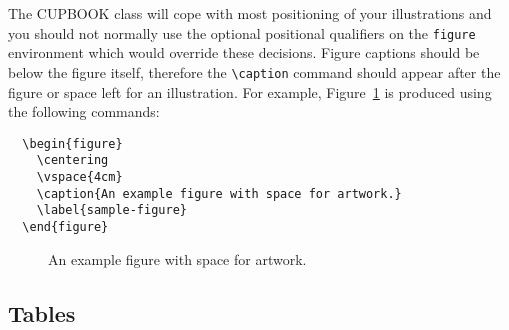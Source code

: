 \documentclass[cup6a]{cupbook}
\begin{document}
The CUPBOOK class will cope with most positioning of your
illustrations and you should not normally use the optional positional
qualifiers on the \verb"figure" environment which would override these
decisions.
 Figure captions should be below the figure itself, therefore the
\verb"\caption" command should appear after the figure or space left
for an illustration.
 For example, Figure~\ref{sample-figure} is produced using the
following commands:
 \begin{verbatim}
  \begin{figure}
    \centering
    \vspace{4cm}
    \caption{An example figure with space for artwork.}
    \label{sample-figure}
  \end{figure}
\end{verbatim}
  \begin{figure}
    \centering
    \vspace{4cm}
    \caption{An example figure with space for artwork.}
    \label{sample-figure}
  \end{figure}

\subsection{Tables}
\end{document}
